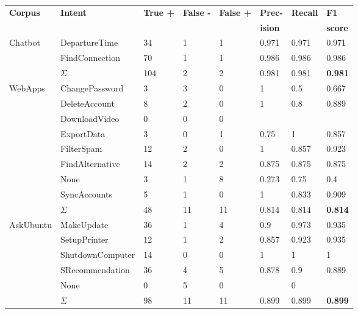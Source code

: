 \begin{center}
    \begin{tabular}{l l l l l l l l}
        \textbf{Corpus} & \textbf{Intent} & \textbf{True +} & \textbf{False -} & \textbf{False +} & \textbf{Prec-} & \textbf{Recall} & \textbf{F1}\\
        & & & & & \textbf{ision} & & \textbf{score} \\
        \hline
        \multirow{3}{*}{Chatbot} & DepartureTime & 34 & 1 & 1 & 0.971 & 0.971 & 0.971 \\
        & FindConnection & 70 & 1 & 1 & 0.986 & 0.986 & 0.986 \\
        & $\Sigma$ & 104 & 2 & 2 & 0.981 & 0.981 & \textbf{0.981} \\
        \hline
        \multirow{9}{*}{WebApps} & ChangePassword & 3 & 3 & 0 & 1 & 0.5 & 0.667 \\
        & DeleteAccount & 8 & 2 & 0 & 1 & 0.8 & 0.889 \\
        & DownloadVideo & 0 & 0 & 0 & & &  \\
        & ExportData & 3 & 0 & 1 & 0.75 & 1 & 0.857 \\
        & FilterSpam & 12 & 2 & 0 & 1 & 0.857 & 0.923 \\
        & FindAlternative & 14 & 2 & 2 & 0.875 & 0.875 & 0.875 \\
        & None & 3 & 1 & 8 & 0.273 & 0.75 & 0.4  \\
        & SyncAccounts & 5 & 1 & 0 & 1 & 0.833 & 0.909 \\
        & $\Sigma$ & 48 & 11 & 11 & 0.814 & 0.814 & \textbf{0.814} \\
        \hline
        \multirow{6}{*}{AskUbuntu} & MakeUpdate & 36 & 1 & 4 & 0.9 & 0.973 & 0.935 \\
        & SetupPrinter & 12 & 1 & 2 & 0.857 & 0.923 & 0.935 \\
        & ShutdownComputer & 14 & 0 & 0 & 1 & 1 & 1 \\
        & SRecommendation & 36 & 4 & 5 & 0.878 & 0.9 & 0.889\\
        & None & 0 & 5 & 0 & & 0 & \\
        & $\Sigma$ & 98 & 11 & 11 & 0.899 & 0.899 & \textbf{0.899}\\
        \hline
    \end{tabular}
\end{center}
